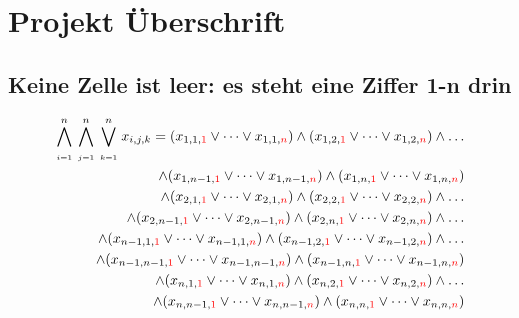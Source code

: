 \documentclass[11pt, a4paper]{article}
\begin{document}
	
	\setlength{\arrayrulewidth}{1pt} %
	
	\section{Projekt Überschrift}
	\subsection{Keine Zelle ist leer: es steht eine Ziffer 1-n drin}
	\begin{align*}
	\bigwedge_{\atop i=1}^n \bigwedge_{\atop j=1}^n \bigvee_{\atop k=1}^n
	x_{i,j,k} = (x_{1,1,{\color{red} 1}} \vee \dots \vee x_{1,1,{\color{red} n}}) 
	\wedge (x_{1,2,{\color{red} 1}} \vee \dots \vee x_{1,2,{\color{red} n}})
	\wedge \dots \\
	\wedge (x_{1,n-1,{\color{red} 1}} \vee \dots \vee x_{1,n-1,{\color{red} n}})
	\wedge (x_{1,n,{\color{red} 1}} \vee \dots \vee x_{1,n,{\color{red} n}}) \\
	\wedge (x_{2,1,{\color{red} 1}} \vee \dots \vee x_{2,1,{\color{red} n}})
	\wedge (x_{2,2,{\color{red} 1}} \vee \dots \vee x_{2,2,{\color{red} n}})
	\wedge \dots \\
	\wedge (x_{2,n-1,{\color{red} 1}} \vee \dots \vee x_{2,n-1,{\color{red} n}})
	\wedge (x_{2,n,{\color{red} 1}} \vee \dots \vee x_{2,n,{\color{red} n}})
	\wedge \dots \\
	\wedge (x_{n-1,1,{\color{red} 1}} \vee \dots \vee x_{n-1,1,{\color{red} n}}) 
	\wedge (x_{n-1,2,{\color{red} 1}} \vee \dots \vee x_{n-1,2,{\color{red} n}})
	\wedge \dots \\
	\wedge (x_{n-1,n-1,{\color{red} 1}} \vee \dots \vee x_{n-1,n-1,{\color{red} n}})
	\wedge (x_{n-1,n,{\color{red} 1}} \vee \dots \vee x_{n-1,n,{\color{red} n}}) \\
	\wedge (x_{n,1,{\color{red} 1}} \vee \dots \vee x_{n,1,{\color{red} n}}) 
	\wedge (x_{n,2,{\color{red} 1}} \vee \dots \vee x_{n,2,{\color{red} n}})
	\wedge \dots \\
	\wedge (x_{n,n-1,{\color{red} 1}} \vee \dots \vee x_{n,n-1,{\color{red} n}})
	\wedge (x_{n,n,{\color{red} 1}} \vee \dots \vee x_{n,n,{\color{red} n}})
	\end{align*}
	
\end{document}

